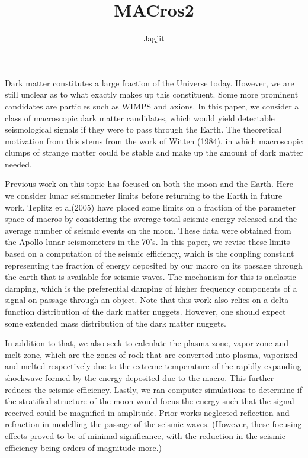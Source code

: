 \documentclass[10pt,a4paper]{article}
\author{Jagjit}
\title{MACros2}
\begin{document}
\par
	Dark matter constitutes a large fraction of the Universe today. However, we are still unclear as to what exactly makes up this constituent. Some more prominent candidates are particles such as WIMPS and axions. In this paper, we consider a class of macroscopic dark matter candidates, which would yield detectable seismological signals if they were to pass through the Earth. The theoretical motivation from this stems from the work of Witten (1984), in which macroscopic clumps of strange matter could be stable and make up the amount of dark matter needed.\par
	 Previous work on this topic has focused on both the moon and the Earth. Here we consider lunar seismometer limits before returning to the Earth in future work. Teplitz et al(2005) have placed some limits on a fraction of the parameter space of macros by considering the average total seismic energy released and the average number of seismic events on the moon. These data were obtained from the Apollo lunar seismometers in the 70's. In this paper, we revise these limits based on a computation of the seismic efficiency, which is the coupling constant representing the fraction of energy deposited by our macro on its passage through the earth that is available for seismic waves. The mechanism for this is anelastic damping, which is the preferential damping of higher frequency components of a signal on passage through an object. Note that this work also relies on a delta function distribution of the dark matter nuggets. However, one should expect some extended mass distribution of the dark matter nuggets.\par
	In addition to that, we also seek to calculate the plasma zone, vapor zone and melt zone, which are the zones of rock that are converted into plasma, vaporized and melted respectively due to the extreme temperature of the rapidly expanding shockwave formed by the energy deposited due to the macro. This further reduces the seismic efficiency. Lastly, we ran computer simulations to determine if the stratified structure of the moon would focus the energy such that the signal received could be magnified in amplitude. Prior works neglected reflection and refraction in modelling the passage of the seismic waves. (However, these focusing effects proved to be of minimal significance, with the reduction in the seismic efficiency being orders of magnitude more.)\par
	
\end{document}
